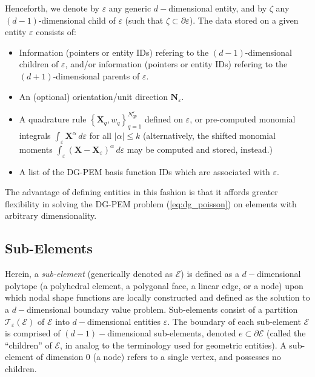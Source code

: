 	Henceforth, we denote by $\varepsilon$ any generic $d-$dimensional entity, and by $\zeta$ any $(d-1)$-dimensional child of $\varepsilon$ (such that $\zeta \subset \partial \varepsilon$). The data stored on a given entity $\varepsilon$ consists of:
	\begin{itemize}
		\item Information (pointers or entity IDs) refering to the $(d-1)$-dimensional children of $\varepsilon$, and/or information (pointers or entity IDs) refering to the $(d+1)$-dimensional parents of $\varepsilon$.
		\item An (optional) orientation/unit direction $\mathbf{N}_\varepsilon$.
		\item A quadrature rule $\left\{ \mathbf{X}_q, w_q \right\}_{q=1}^{N^{\varepsilon}_{qp}}$ defined on $\varepsilon$, or pre-computed monomial integrals $\int_{\varepsilon} \mathbf{X}^\alpha \, d \varepsilon$ for all $|\alpha| \leq k$ (alternatively, the shifted monomial moments $\int_{\varepsilon} (\mathbf{X}-\mathbf{X}_{\varepsilon})^\alpha \, d \varepsilon$ may be computed and stored, instead.)
		\item A list of the DG-PEM basis function IDs which are associated with $\varepsilon$.
	\end{itemize}
	
	The advantage of defining entities in this fashion is that it affords greater flexibility in solving the DG-PEM problem (\ref{eq:dg_poisson}) on elements with arbitrary dimensionality.
	
\subsection*{Sub-Elements}

	Herein, a \textit{sub-element} (generically denoted as $\mathcal{E}$) is defined as a $d-$dimensional polytope (a polyhedral element, a polygonal face, a linear edge, or a node) upon which nodal shape functions are locally constructed and defined as the solution to a $d-$dimensional boundary value problem. Sub-elements consist of a partition $\mathcal{T}_{\varepsilon} (\mathcal{E})$ of $\mathcal{E}$ into $d-$dimensional entities $\varepsilon$. The boundary of each sub-element $\mathcal{E}$ is comprised of $(d-1)-$dimensional sub-elements, denoted $e \subset \partial \mathcal{E}$ (called the ``children'' of $\mathcal{E}$, in analog to the terminology used for geometric entities). A sub-element of dimension $0$ (a node) refers to a single vertex, and possesses no children.
	
